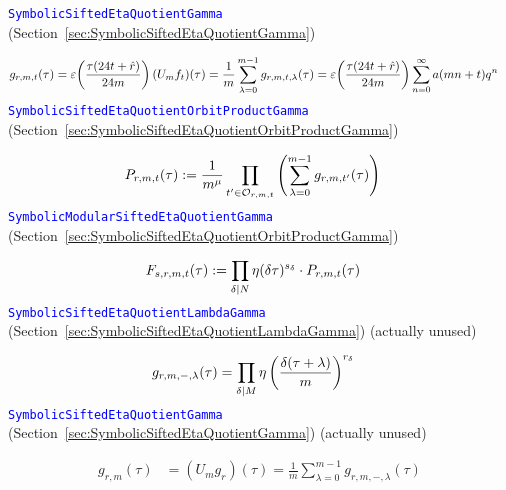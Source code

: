 \documentclass{article}
\begin{document}
\textcolor{blue}{\texttt{SymbolicSiftedEtaQuotientGamma}}
(Section~\ref{sec:SymbolicSiftedEtaQuotientGamma})

\begin{align*}
  g_{r,m,t}(\tau)
  &=
    \varepsilon\!\left(\frac{\tau (24t+\hat{r})}{24m} \right) (U_mf_t)(\tau)
    =
    \frac{1}{m} \sum_{\lambda=0}^{m-1} g_{r,m,t,\lambda}(\tau)
    =
    \varepsilon\!\left(\frac{\tau (24t+\hat{r})}{24m}\right) \sum_{n=0}^\infty a(mn+t) q^n
\end{align*}
\textcolor{blue}{\texttt{SymbolicSiftedEtaQuotientOrbitProductGamma}}
(Section~\ref{sec:SymbolicSiftedEtaQuotientOrbitProductGamma})

\begin{align*}
  P_{r, m, t}(\tau)
  &:=
    \frac{1}{m^\mu}
    \prod_{t' \in \mathcal{O}_{r,m,t}}
    \left(
    \sum_{\lambda=0}^{m-1} g_{r,m,t'}(\tau)
    \right)
\end{align*}
\textcolor{blue}{\texttt{SymbolicModularSiftedEtaQuotientGamma}}
(Section~\ref{sec:SymbolicSiftedEtaQuotientOrbitProductGamma})

\begin{align*}
  F_{s, r, m, t}(\tau)
  &:=
    \prod_{\delta \mid N} \eta(\delta \tau)^{s_\delta} \cdot P_{r, m, t}(\tau)
\end{align*}
\textcolor{blue}{\texttt{SymbolicSiftedEtaQuotientLambdaGamma}}
(Section~\ref{sec:SymbolicSiftedEtaQuotientLambdaGamma})
(actually unused)

\begin{align*}
  g_{r,m,-,\lambda}(\tau)
  &=
    \prod_{\delta \mid M}
    \eta\left(\frac{\delta(\tau+\lambda)}{m}\right)^{r_\delta}
\end{align*}
\textcolor{blue}{\texttt{SymbolicSiftedEtaQuotientGamma}}
(Section~\ref{sec:SymbolicSiftedEtaQuotientGamma})
(actually unused)

\begin{align*}
  g_{r,m}(\tau)
  &=
    (U_m g_r)(\tau)
    =
    \frac{1}{m} \sum_{\lambda=0}^{m-1} g_{r,m,-,\lambda}(\tau)
\end{align*}
\end{document}
